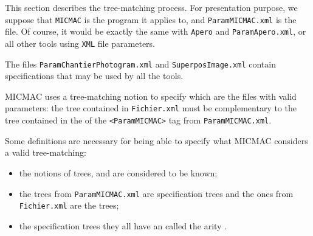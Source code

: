 This section describes the tree-matching process. For presentation purpose, we
suppose that {\tt MICMAC} is the program it applies to, and
{\tt ParamMICMAC.xml} is the file. Of course, it would be exactly the same
with {\tt Apero} and {\tt ParamApero.xml}, or all other tools
using {\tt XML} file parameters.

The files {\tt ParamChantierPhotogram.xml} and {\tt SuperposImage.xml} contain 
specifications that may be used by all the tools.


\label{FR:Mic:Tree:Match}

MICMAC uses a tree-matching notion to specify which are the files with valid parameters:
the tree contained in {\tt Fichier.xml} must be complementary to the tree contained in 
the  of the {\tt <ParamMICMAC>} tag from {\tt ParamMICMAC.xml}.

Some definitions are necessary for being able to specify what MICMAC considers
a valid tree-matching:
\begin{itemize}
    \item the notions of trees,  %
    and  are considered to be known;
    \item the trees from {\tt ParamMICMAC.xml} are specification trees and
    the ones from {\tt Fichier.xml} are the  trees;
    \item the specification trees they all have an  called the arity 
    .
\end{itemize}

\begin{comment}
MICMAC utilise une notion d'appariement d'arbres
pour  sp\'ecifier quels sont les fichiers de param\`etres valides :
l'arbre contenu dans {\tt Fichier.xml} doit \^etre appariable sur 
l'arbre contenu dans la descendance du  tag {\tt <ParamMICMAC>} contenu
dans la ressource {\tt ParamMICMAC.xml}.

Quelques d\'efinitions sont n\'ecessaires pour pouvoir pr\'eciser 
ce que MICMAC consid\`ere comme un appariement d'arbre valide :

\begin{itemize}
   \item les notions d'abres, de fils et de n\oe{}uds terminaux sont suppos\'ees
         connues;
   \item  on appelle arbre de sp\'ecification les arbres de 
          {\tt ParamMICMAC.xml}  et arbre effectif les arbres de  
          {\tt Fichier.xml};
   \item les arbres de sp\'ecification ont tous un attibut dit attribut d'arit\'e;
         cet attribut, d\'esign\'e par le mot-clef $Nb$ peut valoir $1$,
         $?$, $*$ ou $+$; ce mot cl\'e repr\'esente un intervalle d'entier
         selon les conventions classique : $1$=exactement un, $?$= un ou z\'ero,
         $+$=un au moins, $*$= un nombre quelconque;
    
\end{itemize}
\end{comment}


